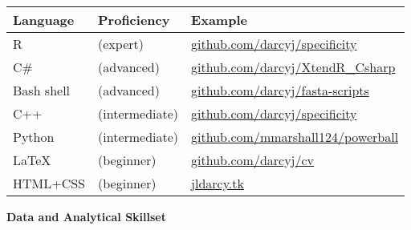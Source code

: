 \documentclass{article}
\begin{document}
\\\begin{tabular}{l l l}
  Language & Proficiency & Example\\
  \hline
  R & (expert) & \href{https://github.com/darcyj/specificity}{github.com/darcyj/specificity}\\
  C\# & (advanced) & \href{https://github.com/darcyj/XtendR_Csharp}{github.com/darcyj/XtendR\_Csharp}\\
  Bash shell & (advanced) & \href{https://github.com/darcyj/fasta-scripts}{github.com/darcyj/fasta-scripts}\\
  C++ & (intermediate) & \href{https://github.com/darcyj/specificity}{github.com/darcyj/specificity}\\ 
  Python & (intermediate) & \href{ https://github.com/mmarshall124/powerball}{github.com/mmarshall124/powerball}\\
  \LaTeX & (beginner) & \href{https://github.com/darcyj/cv}{github.com/darcyj/cv}\\
  HTML+CSS & (beginner) & \url{jldarcy.tk}\\
\end{tabular}
\vspace{3mm}

{\large  \textbf{Data and Analytical Skillset}}
\end{document}
